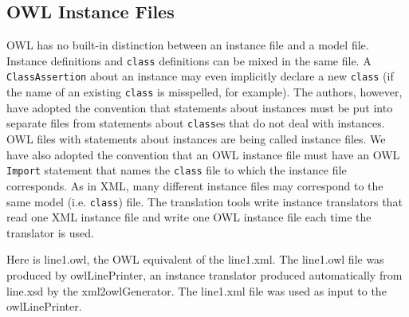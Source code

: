 \documentclass[preprint,12pt]{elsarticle}
\begin{document}
\subsection{OWL Instance Files}
\label{owlInstanceFiles}

OWL has no built-in distinction between an instance file and a model file.
Instance definitions and {\tt class} definitions can be mixed in the same
file. A {\tt ClassAssertion} about an instance may even implicitly declare
a new {\tt class} (if the name of an existing {\tt class} is misspelled,
for example). The authors, however, have adopted the convention that
statements about instances must be put into separate files from statements
about {\tt class}es that do not deal with instances. OWL files with
statements about instances are being called instance files. We have also
adopted the convention that an OWL instance file must have an OWL {\tt
  Import} statement that names the {\tt class} file to which the instance
file corresponds. As in XML, many different instance files may correspond
to the same model (i.e. {\tt class}) file. The translation tools write
instance translators that read one XML instance file and write one OWL
instance file each time the translator is used.

Here is line1.owl, the OWL equivalent of the line1.xml. The line1.owl file
was produced by owlLinePrinter, an instance translator produced
automatically from line.xsd by the xml2owlGenerator. The line1.xml file was
used as input to the owlLinePrinter.
\end{document}
